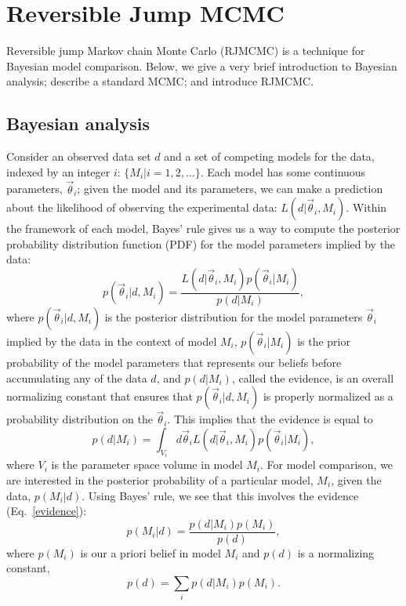 \documentclass[prd,preprint]{revtex4}
\newcommand{\vtheta}{\vec{\theta}}
\newcommand{\be}{\begin{equation}}
\newcommand{\ee}{\end{equation}}
\newcommand{\bel}[1]{\begin{equation}\label{#1}}
\begin{document}
\section{Reversible Jump MCMC}

Reversible jump Markov chain Monte Carlo (RJMCMC) \cite{Green1995} is a technique for Bayesian model comparison.  Below, we give a very brief introduction to Bayesian analysis; describe a standard MCMC; and introduce RJMCMC.

\subsection{Bayesian analysis}

Consider an observed data set $d$ and a set of competing models for
the data, indexed by an integer $i$: $\{M_i | i = 1, 2, \ldots \}$.
Each model has some continuous parameters, $\vtheta_i$; given the
model and its parameters, we can make a prediction about the
likelihood of observing the experimental data: $L(d|\vtheta_i, M_i)$.
Within the framework of each model, Bayes' rule gives us a way to
compute the posterior probability distribution function (PDF) for the
model parameters implied by the data:
\be
  p(\vtheta_i | d, M_i) = \frac{L(d|\vtheta_i, M_i) p(\vtheta_i|M_i)}{p(d|M_i)},
\ee
where $p(\vtheta_i |d, M_i)$ is the posterior distribution for the
model parameters $\vtheta_i$ implied by the data in the context of
model $M_i$, $p(\vtheta_i|M_i)$ is the prior probability of the model
parameters that represents our beliefs before accumulating any of the
data $d$, and $p(d|M_i)$, called the evidence, is an overall
normalizing constant that ensures that $p(\vtheta_i|d,M_i)$ is
properly normalized as a probability distribution on the $\vtheta_i$.
This implies that the evidence is equal to
\bel{evidence}
  p(d|M_i) = \int_{V_i} d\vtheta_i L(d|\vtheta_i, M_i) p(\vtheta_i|M_i),
\ee
where $V_i$ is the parameter space volume in model $M_i$.  For model
comparison, we are interested in the posterior probability of a
particular model, $M_i$, given the data, $p(M_i|d)$.  Using Bayes'
rule, we see that this involves the evidence (Eq.~\eqref{evidence}):
\be
p(M_i|d) = \frac{p(d|M_i) p(M_i)}{p(d)},
\ee
where $p(M_i)$ is our a priori belief in model $M_i$ and $p(d)$ is a
normalizing constant,
\be
p(d)=\sum_i p(d|M_i) p(M_i).
\ee
\end{document}

